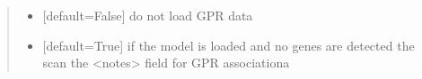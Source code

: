 \documentclass[letterpaper,12pt,english]{sphinxmanual}
\begin{document}
\begin{fulllineitems}
\begin{quote}
\begin{description}
\begin{itemize}
\item {} 
\sphinxAtStartPar
{} \textendash{} {[}default=False{]} do not load GPR data

\item {} 
\sphinxAtStartPar
{} \textendash{} {[}default=True{]} if the model is loaded and no genes are detected the scan the \textless{}notes\textgreater{} field for GPR associationa

\end{itemize}

\end{description}\end{quote}

\end{fulllineitems}
\end{document}
